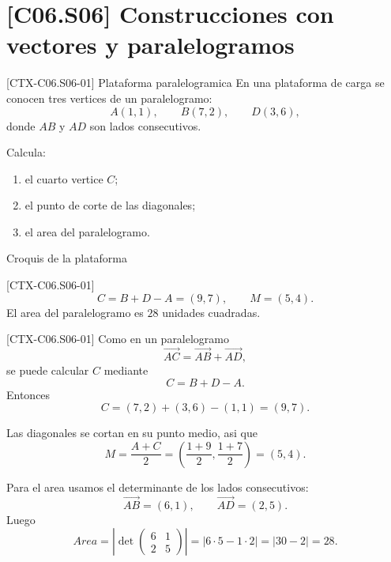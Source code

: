 \section{[C06.S06] Construcciones con vectores y paralelogramos}

\begin{exercise}{[CTX-C06.S06-01] Plataforma paralelogramica}
En una plataforma de carga se conocen tres vertices de un paralelogramo:
\[
A(1,1),\qquad B(7,2),\qquad D(3,6),
\]
donde \(AB\) y \(AD\) son lados consecutivos.

Calcula:
\begin{enumerate}
  \item el cuarto vertice \(C\);
  \item el punto de corte de las diagonales;
  \item el area del paralelogramo.
\end{enumerate}
\end{exercise}

\begin{databox}{Croquis de la plataforma}
\begin{center}
\end{center}
\end{databox}

\begin{shortanswer}{[CTX-C06.S06-01]}
\[
C=B+D-A=(9,7),
\qquad
M=\left(5,4\right).
\]
El area del paralelogramo es \(28\) unidades cuadradas.
\end{shortanswer}

\begin{fullsolution}{[CTX-C06.S06-01]}
Como en un paralelogramo
\[
\overrightarrow{AC}=\overrightarrow{AB}+\overrightarrow{AD},
\]
se puede calcular \(C\) mediante
\[
C=B+D-A.
\]
Entonces
\[
C=(7,2)+(3,6)-(1,1)=(9,7).
\]

Las diagonales se cortan en su punto medio, asi que
\[
M=\frac{A+C}{2}=
\left(\frac{1+9}{2},\frac{1+7}{2}\right)=(5,4).
\]

Para el area usamos el determinante de los lados consecutivos:
\[
\overrightarrow{AB}=(6,1),
\qquad
\overrightarrow{AD}=(2,5).
\]
Luego
\[
Area=\left|\det
\begin{pmatrix}
6 & 1\\
2 & 5
\end{pmatrix}
\right|
=|6\cdot 5-1\cdot 2|=|30-2|=28.
\]
\end{fullsolution}
